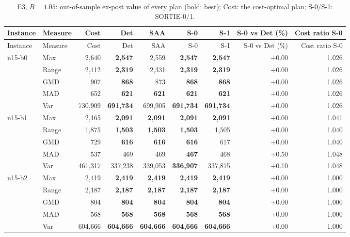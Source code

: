 \begin{small}
\begin{longtable}{llrrrrrrr}
\caption{E3, $B=1.05$: out-of-sample ex-post value of every plan (bold: best); Cost: the cost-optimal plan; S-0/S-1: SORTIE-0/1.}\label{tab:app_e3_105}\\
\toprule
Instance & Measure & Cost & Det & SAA & S-0 & S-1 & S-0 vs Det (\%) & Cost ratio S-0\\
\midrule
\endfirsthead
\toprule
Instance & Measure & Cost & Det & SAA & S-0 & S-1 & S-0 vs Det (\%) & Cost ratio S-0\\
\midrule
\endhead
\bottomrule
\endfoot
n15-b0 & Max & 2,640 & \textbf{2,547} & 2,559 & \textbf{2,547} & \textbf{2,547} & +0.00 & 1.026 \\
 & Range & 2,412 & \textbf{2,319} & 2,331 & \textbf{2,319} & \textbf{2,319} & +0.00 & 1.026 \\
 & GMD & 907 & \textbf{868} & 873 & \textbf{868} & \textbf{868} & +0.00 & 1.026 \\
 & MAD & 652 & \textbf{621} & \textbf{621} & \textbf{621} & \textbf{621} & +0.00 & 1.026 \\
 & Var & 730,909 & \textbf{691,734} & 699,905 & \textbf{691,734} & \textbf{691,734} & +0.00 & 1.026 \\
n15-b1 & Max & 2,165 & \textbf{2,091} & \textbf{2,091} & \textbf{2,091} & \textbf{2,091} & +0.00 & 1.041 \\
 & Range & 1,875 & \textbf{1,503} & \textbf{1,503} & \textbf{1,503} & 1,505 & +0.00 & 1.040 \\
 & GMD & 729 & \textbf{616} & \textbf{616} & \textbf{616} & 617 & +0.00 & 1.040 \\
 & MAD & 537 & 469 & 469 & \textbf{467} & 468 & +0.50 & 1.048 \\
 & Var & 461,317 & 337,238 & 339,053 & \textbf{336,907} & 337,815 & +0.10 & 1.048 \\
n15-b2 & Max & 2,419 & \textbf{2,419} & \textbf{2,419} & \textbf{2,419} & \textbf{2,419} & +0.00 & 1.000 \\
 & Range & 2,187 & \textbf{2,187} & \textbf{2,187} & \textbf{2,187} & \textbf{2,187} & +0.00 & 1.000 \\
 & GMD & 804 & \textbf{804} & \textbf{804} & \textbf{804} & \textbf{804} & +0.00 & 1.000 \\
 & MAD & 568 & \textbf{568} & \textbf{568} & \textbf{568} & \textbf{568} & +0.00 & 1.000 \\
 & Var & 604,666 & \textbf{604,666} & \textbf{604,666} & \textbf{604,666} & \textbf{604,666} & +0.00 & 1.000 \\

\end{longtable}
\end{small}
